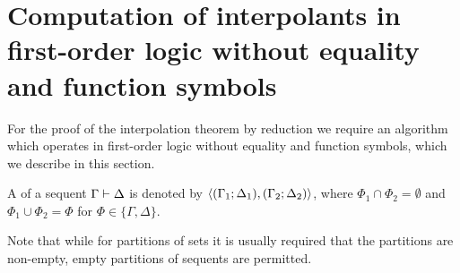 \section{Computation of interpolants in first-order logic without equality and function symbols}

For the proof of the interpolation theorem by reduction we require an algorithm which operates in first-order logic without equality and function symbols, which we describe in this section.


\begin{defi}
	A  of a sequent $\Gamma \vdash \Delta$ is denoted by $ \langle (\Gamma_1; \Delta_1), (\Gamma_2; \Delta_2)\rangle $, where $\Phi_1 \cap \Phi_2 = \emptyset$ and $\Phi_1 \cup \Phi_2 = \Phi$ for $\Phi \in \{\Gamma, \Delta\}$.
\end{defi}
Note that while for partitions of sets it is usually required that the partitions are non-empty, empty partitions of sequents are permitted.



